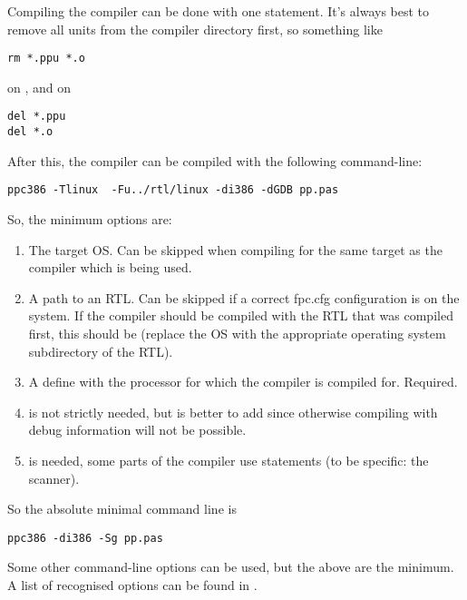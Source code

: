 {Compiling the compiler can be done with one statement. It's always best to
remove all units from the compiler directory first, so something like
\begin{verbatim}
rm *.ppu *.o
\end{verbatim}
on \linux, and on \dos
\begin{verbatim}
del *.ppu
del *.o
\end{verbatim}
After this, the compiler can be compiled with the following command-line:
\begin{verbatim}
ppc386 -Tlinux  -Fu../rtl/linux -di386 -dGDB pp.pas
\end{verbatim}
So, the minimum options are:
\begin{enumerate}
\item The target OS. Can be skipped when compiling for the same target as
the compiler which is being used.
\item A path to an RTL. Can be skipped if a correct fpc.cfg configuration
is on the system. If the compiler should be compiled with the RTL that was
compiled first, this should be  (replace the OS with the 
appropriate operating system subdirectory of the RTL).
\item A define with the processor for which the compiler is compiled for. Required.
\item {} is not strictly needed, but is better to add since
otherwise compiling with debug information will not be possible.
\item {} is needed, some parts of the compiler use 
statements (to be specific: the scanner).
\end{enumerate}
So the absolute minimal command line is
\begin{verbatim}
ppc386 -di386 -Sg pp.pas
\end{verbatim}

Some other command-line options can be used, but the above are the
minimum. A list of recognised options can be found in .

}
